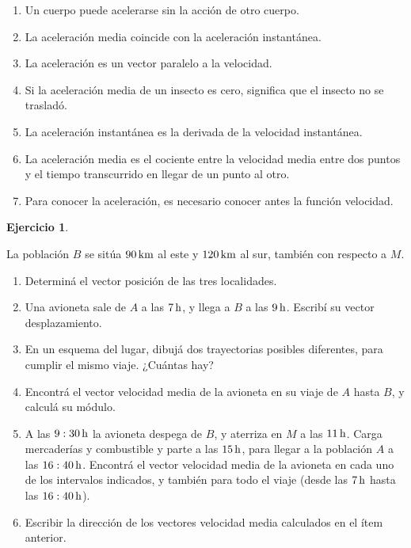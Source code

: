 \documentclass[a4paper,12pt,twoside]{book}
\newtheorem{ejercicio}{{Ejercicio}}[chapter]
\begin{document}
\begin{mdframed}[style=ejercicio-conceptual]
\begin{enumerate}
\begin{enumerate}
            \item Un cuerpo puede acelerarse sin la acción de otro cuerpo.

            \item La aceleración media coincide con la aceleración instantánea.
            
            \item La aceleración  es un vector paralelo a la velocidad.

            \item Si la aceleración media de un insecto es cero, significa que el insecto no se trasladó.

            \item La aceleración instantánea es la derivada de la velocidad instantánea.

            \item La aceleración media es el cociente entre la velocidad media entre dos puntos y el tiempo transcurrido en llegar de un punto al otro.

            \item Para conocer la aceleración, es necesario conocer antes la función velocidad.
        \end{enumerate}
    \end{enumerate}
\end{mdframed}

\begin{mdframed}[style=ejercicio-conceptual]
    \begin{ejercicio}
    \end{ejercicio}
    La población $B$ se sitúa $90\,\si{\kilo\metre}$ al este y $120\,\si{\kilo\metre}$ al sur, también con respecto a $M$.
    \begin{enumerate}
        \item Determiná el vector posición de las tres localidades.
        \item Una avioneta sale de $A$ a las $7\,\si{\hour}$, y llega a $B$ a las $9\,\si{\hour}$. Escribí su vector desplazamiento.
        \item En un esquema del lugar, dibujá dos trayectorias posibles diferentes, para cumplir el mismo viaje. ¿Cuántas hay?
        \item Encontrá el vector velocidad media de la avioneta en su viaje de $A$ hasta $B$, y calculá su módulo.
        \item A las $9:30\,\si{\hour}$ la avioneta despega de $B$, y aterriza en $M$ a las $11\,\si{\hour}$. Carga mercaderías y combustible y parte a las $15\,\si{\hour}$, para llegar a la población $A$ a las $16:40\,\si{\hour}$. Encontrá el vector velocidad media de la avioneta en cada uno de los intervalos indicados, y también para todo el viaje (desde las $7\,\si{\hour}$ hasta las $16:40\,\si{\hour}$).
        \item Escribir la dirección de los vectores velocidad media calculados en el ítem anterior.
    \end{enumerate}
\end{mdframed}
\end{document}
